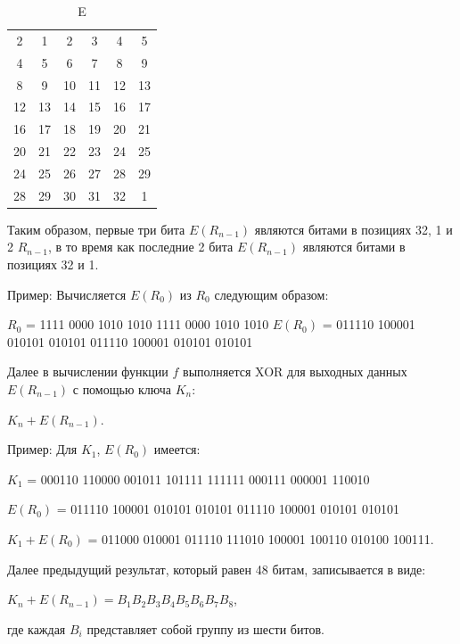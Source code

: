 \begin{table}[ht!]
    \begin{center}
	\captionsetup{justification=raggedright,singlelinecheck=off}
	\caption{\label{tbl:e} E}
        \begin{tabular}{ |c c c c c c|}
                2  &   1   &  2   &   3   &   4   &  5 \\
                  4   &   5  &   6   &   7     & 8  &   9 \\
                  8    &  9   & 10    & 11   &  12   & 13 \\
                 12   &  13  &  14  &   15   &  16  &  17 \\
                 16   &  17  &  18  &   19   &  20  &  21 \\
                 20   &  21  &  22  &   23  &   24  &  25 \\
                 24   &  25  &  26  &   27  &   28  &  29 \\
                 28   &  29  &  30  &   31   &  32  &   1 \\
        \end{tabular}
    \end{center}
\end{table}

Таким образом, первые три бита $E(R_{n-1})$ являются битами в позициях 32, 1 и 2 $R_{n-1}$, в то время как последние 2 бита $E(R_{n-1})$ являются битами в позициях 32 и 1.

Пример: Вычисляется $E(R_0)$ из $R_0$ следующим образом:

$R_0$ = 1111 0000 1010 1010 1111 0000 1010 1010
$E(R_0)$ = 011110 100001 010101 010101 011110 100001 010101 010101

Далее в вычислении функции $f$ выполняется XOR для выходных данных $E(R_{n-1})$ с помощью ключа $K_n$:

$K_n + E(R_{n-1})$.

Пример: Для $K_1$, $E(R_0)$ имеется:

$K_1$ = 000110 110000 001011 101111 111111 000111 000001 110010

$E(R_0)$ = 011110 100001 010101 010101 011110 100001 010101 010101

$K_1+E(R_0)$ = 011000 010001 011110 111010 100001 100110 010100 100111.

Далее предыдущий результат, который равен 48 битам, записывается в виде:

$K_n + E(R_{n-1}) = B_1 B_2 B_3 B_4 B_5 B_6 B_7 B_8$,

где каждая $B_i$ представляет собой группу из шести битов. 

